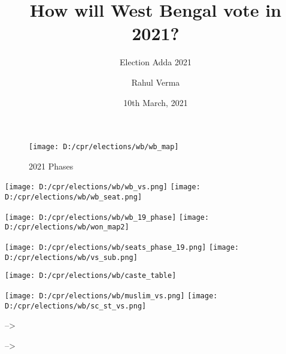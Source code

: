 \documentclass[
  ignorenonframetext,
]{beamer}
\title{How will West Bengal vote in 2021?}
\subtitle{Election Adda 2021}
\author{Rahul Verma}
\date{10th March, 2021}
\institute{Centre for Policy Research}
\begin{document}
\frame{\titlepage}

\begin{frame}
\begin{figure}

{\centering \texttt{[image: D:/cpr/elections/wb/wb\_map]} 

}

\caption{2021 Phases}\label{fig:unnamed-chunk-1}
\end{figure}
\end{frame}

\begin{frame}
\centering

\texttt{[image: D:/cpr/elections/wb/wb\_vs.png]}
\texttt{[image: D:/cpr/elections/wb/wb\_seat.png]}
\end{frame}

\begin{frame}
\begin{center}\texttt{[image: D:/cpr/elections/wb/wb\_19\_phase]} \texttt{[image: D:/cpr/elections/wb/won\_map2]} \end{center}
\end{frame}

\begin{frame}
\centering

\texttt{[image: D:/cpr/elections/wb/seats\_phase\_19.png]}
\texttt{[image: D:/cpr/elections/wb/vs\_sub.png]}
\end{frame}

\begin{frame}
\begin{center}\texttt{[image: D:/cpr/elections/wb/caste\_table]} \end{center}
\end{frame}

\begin{frame}
\centering

\texttt{[image: D:/cpr/elections/wb/muslim\_vs.png]}
\texttt{[image: D:/cpr/elections/wb/sc\_st\_vs.png]}

--\textgreater{}

--\textgreater{}
\end{frame}
\end{document}

